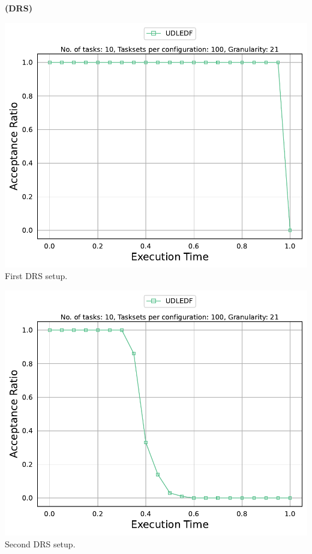 \documentclass[]{article}
\begin{document}
	\begin{minipage}[t]{0.48\linewidth}
		\centering
		\textbf{(DRS)}
		\vspace{0.3cm}
		
		\includegraphics[width=\linewidth]{UDLEDF_1stSetup_DRS.pdf}
		First DRS setup.
		\vspace{0.3cm}
		
		\includegraphics[width=\linewidth]{UDLEDF_2ndSetup_DRS.pdf}
		Second DRS setup.
		\vspace{0.3cm}
		

\end{minipage}
\end{document}
